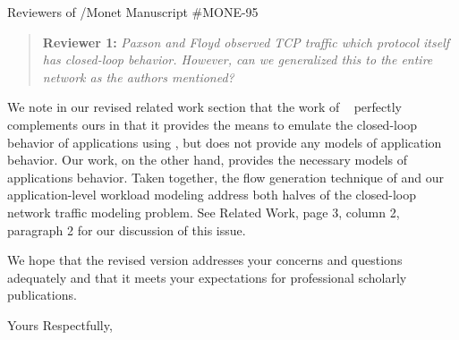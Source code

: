 \documentclass{letter}
\newenvironment{reviewer}[1]%
{\begin{quote}\textbf{Reviewer #1:} \it}{\end{quote}}
\begin{document}
\begin{letter}{Reviewers of /Monet Manuscript \#MONE-95}
\begin{reviewer}{1}
Paxson and Floyd observed TCP traffic which protocol itself has closed-loop behavior. However, can we generalized this to the entire network as the authors mentioned?
\end{reviewer}
We note in our revised related work section that the work of \FHC~\cite{Hernandez06:dissertation} perfectly complements ours in that it provides the means to emulate the closed-loop behavior of applications using , but does not provide any models of application behavior.
Our work, on the other hand, provides the necessary models of applications behavior.
Taken together, the  flow generation technique of \FHC and our application-level workload modeling address both halves of the closed-loop network traffic modeling problem.
See Related Work, page 3, column 2, paragraph 2 for our discussion of this issue.

% 

We hope that the revised version addresses your concerns and questions adequately and that it meets your expectations for professional scholarly publications.

\closing{Yours Respectfully,}
\signature{Stefan~Karpinski}

\vfill



\end{letter}
\end{document}
